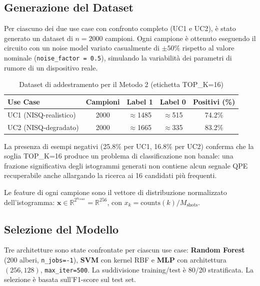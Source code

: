 \begin{onehalfspace}
\subsection{Generazione del Dataset}

Per ciascuno dei due use case con confronto completo (UC1 e UC2), è stato generato un dataset di $n = 2000$ campioni. Ogni campione è ottenuto eseguendo il circuito con un noise model variato casualmente di $\pm 50\%$ rispetto al valore nominale (\texttt{noise\_factor = 0.5}), simulando la variabilità dei parametri di rumore di un dispositivo reale.

\begin{table}[H]
\centering
\caption{Dataset di addestramento per il Metodo 2 (etichetta TOP\_K=16)}
\label{tab:dataset_m2}
\begin{tabular}{lcccc}
\hline
\textbf{Use Case} & \textbf{Campioni} & \textbf{Label 1} & \textbf{Label 0} & \textbf{Positivi (\%)} \\
\hline
UC1 (NISQ-realistico) & 2000 & $\approx$1485 & $\approx$515 & 74.2\% \\
UC2 (NISQ-degradato)  & 2000 & $\approx$1665 & $\approx$335 & 83.2\% \\
\hline
\end{tabular}
\end{table}

La presenza di esempi negativi (25.8\% per UC1, 16.8\% per UC2) conferma che la soglia TOP\_K=16 produce un problema di classificazione non banale: una frazione significativa degli istogrammi generati non contiene alcun segnale QPE recuperabile anche allargando la ricerca ai 16 candidati più frequenti.

Le feature di ogni campione sono il vettore di distribuzione normalizzato dell'istogramma: $\mathbf{x} \in \mathbb{R}^{2^{n_{\text{count}}}} = \mathbb{R}^{256}$, con $x_k = \text{counts}(k) / M_{\text{shots}}$.

\subsection{Selezione del Modello}

Tre architetture sono state confrontate per ciascun use case: \textbf{Random Forest} (200 alberi, \texttt{n\_jobs=-1}), \textbf{\ac{SVM}} con kernel RBF e \textbf{\ac{MLP}} con architettura $(256, 128)$, \texttt{max\_iter=500}. La suddivisione training/test è 80/20 stratificata. La selezione è basata sull'F1-score sul test set.


\end{onehalfspace}
